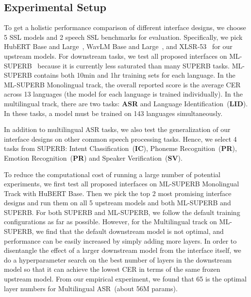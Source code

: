 



\subsection{Experimental Setup}

To get a holistic performance comparison of different interface designs, we choose 5 SSL models and 2 speech SSL benchmarks for evaluation.
Specifically, we pick HubERT Base and Large~\cite{hsu2021hubert}, WavLM Base and Large~\cite{Chen2021WavLMLS}, and XLSR-53~\cite{Conneau2020xlsr} for our upstream models.
For downstream tasks, we test all proposed interfaces on ML-SUPERB~\cite{shi23g_mlsuperb} because it is currently less saturated than many SUPERB tasks.
ML-SUPERB contains both 10min and 1hr training sets for each language.
In the ML-SUPERB Monolingual track, the overall reported score is the average CER across 13 languages (the model for each language is trained individually).
In the multilingual track, there are two tasks: \textbf{ASR} and Language Identification~(\textbf{LID}).
In these tasks, a model must be trained on 143 languages simultaneously.

In addition to multilingual ASR tasks, we also test the generalization of our interface designs on other common speech processing tasks.
Hence, we select 4 tasks from  SUPERB: Intent Classification~(\textbf{IC}), Phoneme Recognition~(\textbf{PR}), Emotion Recognition~(\textbf{PR}) and Speaker Verification~(\textbf{SV}).

To reduce the computational cost of running a large number of potential experiments, we first test all proposed interfaces on ML-SUPERB Monolingual Track with HuBERT Base.
Then we pick the top 2 most promising interface designs and run them on all 5 upstream models and both ML-SUPERB and SUPERB.
For both SUPERB and ML-SUPERB, we follow the default training configurations as far as possible.
However, for the Multilingual track on ML-SUPERB, we find that the default downstream model
is not optimal, and performance can be easily increased by simply adding more layers.
In order to disentangle the effect of a larger downstream model from the interface itself, we do a hyperparameter search on the best number of layers in the downstream model so that it can achieve the lowest CER in terms of the same frozen upstream model.
From our empirical experiment, we found that 65 is the optimal layer numbers for Multilingual ASR~(about 56M params).

